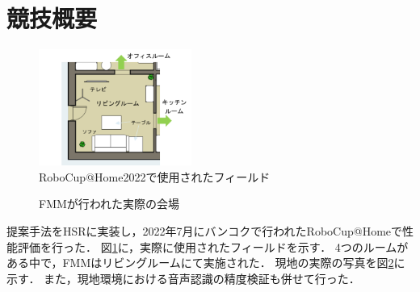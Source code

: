 \documentclass[a4j]{jarticle}
\begin{document}
\section{競技概要}
\begin{figure}[ht]
  \centering
  \includegraphics[width=5cm]{images/robocup/arenaBangkok_rotate_trim_yy2.png}
  \caption{RoboCup@Home2022で使用されたフィールド}
  \label{robocup_field}
\end{figure}
\begin{figure}[ht]
  \centering
  \caption{FMMが行われた実際の会場}
  \label{onsite_overview_1}
\end{figure}
提案手法をHSRに実装し，2022年7月にバンコクで行われたRoboCup@Homeで性能評価を行った．
図\ref{robocup_field}に，実際に使用されたフィールドを示す．
4つのルームがある中で，FMMはリビングルームにて実施された．
現地の実際の写真を図\ref{onsite_overview_1}に示す．
また，現地環境における音声認識の精度検証も併せて行った．
\end{document}

